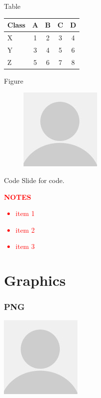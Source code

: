\begin{frame}{Table}
\begin{tabular}{lcccc}
  Class & A & B & C & D \\\hline
  X     & 1 & 2 & 3 & 4 \pause\\
  Y     & 3 & 4 & 5 & 6 \pause\\
  Z     &5&6&7&8
\end{tabular}
\end{frame}

\begin{frame}{Figure}
  \begin{figure}
    \includegraphics{avatar}
  \end{figure}
\end{frame}

\begin{frame}[fragile]{Code}
  Slide for code.
  
\end{frame}
\begin{versiona}
  \textcolor{red}{\textbf{NOTES}
    \begin{itemize}
    \item item 1
    \item item 2
    \item item 3
  \end{itemize}}
\end{versiona}

\section{Graphics}

\begin{frame}
  \frametitle{PNG}
  \begin{center}
    \includegraphics{avatar}
  \end{center}
\end{frame}

